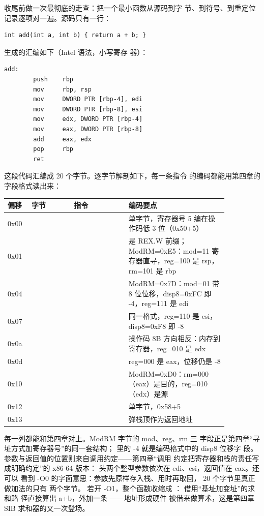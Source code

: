收尾前做一次最彻底的走查：把一个最小函数从源码到字
节、到符号、到重定位记录逐项对一遍。源码只有一行：

\begin{lstlisting}
int add(int a, int b) { return a + b; }
\end{lstlisting}

 生成的汇编如下（Intel 语法，小写寄存
器）：

\begin{lstlisting}
add:
        push    rbp
        mov     rbp, rsp
        mov     DWORD PTR [rbp-4], edi
        mov     DWORD PTR [rbp-8], esi
        mov     edx, DWORD PTR [rbp-4]
        mov     eax, DWORD PTR [rbp-8]
        add     eax, edx
        pop     rbp
        ret
\end{lstlisting}

这段代码汇编成 20 个字节。逐字节解剖如下，每一条指令
的编码都能用第四章的字段格式读出来：

\begin{longtable}{L{0.07\linewidth}L{0.17\linewidth}L{0.22\linewidth}L{0.4\linewidth}}
\toprule
偏移 & 字节 & 指令 & 编码要点 \\
\midrule
0x00 &  &  & 单字节，寄存器号 5 编在操作码低 3 位（0x50+5） \\
0x01 &  &  &  是 REX.W 前缀；ModRM=0xE5：mod=11 寄存器直寻，reg=100 是 rsp，rm=101 是 rbp \\
0x04 &  &  & ModRM=0x7D：mod=01 带 8 位位移，disp8=0xFC 即 -4，reg=111 是 edi \\
0x07 &  &  & 同一格式，reg=110 是 esi，disp8=0xF8 即 -8 \\
0x0a &  &  & 操作码 8B 方向相反：内存到寄存器，reg=010 是 edx \\
0x0d &  &  & reg=000 是 eax，位移仍是 -8 \\
0x10 &  &  & ModRM=0xD0：rm=000（eax）是目的，reg=010（edx）是源 \\
0x12 &  &  & 单字节，0x58+5 \\
0x13 &  &  & 弹栈顶作为返回地址 \\
\bottomrule
\end{longtable}

每一列都能和第四章对上。ModRM 字节的 mod、reg、rm 三
字段正是第四章“寻址方式加寄存器号”的同一套结构；
\code{[rbp-4]} 里的 -4 就是编码格式中的 disp8 位移字
段。参数与返回值的位置则来自调用约定——第四章“调用
约定把寄存器和栈的责任写成明确约定”的 x86-64 版本：
头两个整型参数依次在 edi、esi，返回值在 eax。还可以
看到 -O0 的字面意思：参数先原样存入栈、用时再取回，
20 个字节里真正做加法的只有  两个字节。
若开 -O1，整个函数收缩成 ：
 借用“基址加变址”的求和路
径直接算出 a+b，外加一条 ——地址形成硬件
被借来做算术，这是第四章 SIB 求和器的又一次登场。

